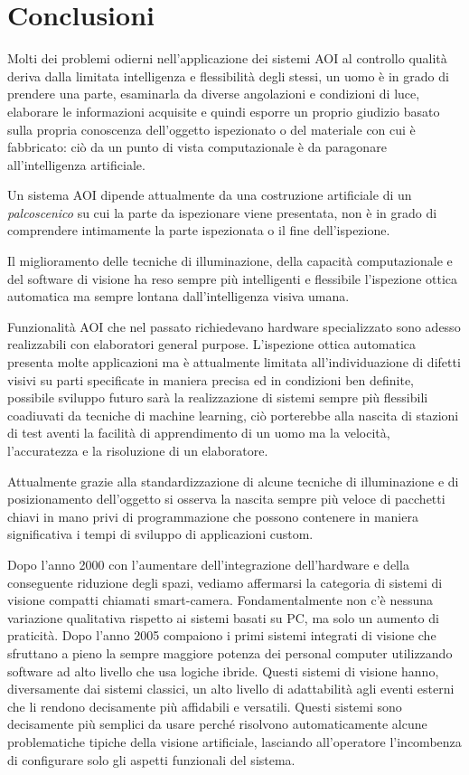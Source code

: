 \chapter{Conclusioni} 

Molti dei problemi odierni nell'applicazione dei sistemi
AOI al controllo qualità deriva dalla limitata intelligenza e flessibilità
degli stessi, un uomo è in grado di prendere una parte, esaminarla da diverse
angolazioni e condizioni di luce, elaborare le informazioni acquisite e quindi
esporre un proprio giudizio basato sulla propria conoscenza dell'oggetto
ispezionato o del materiale con cui è fabbricato: ciò da un punto di vista
computazionale è da paragonare all'intelligenza artificiale.

Un sistema AOI dipende attualmente da una costruzione artificiale di un \emph{palcoscenico} su
cui la parte da ispezionare viene presentata, non è in grado di comprendere
intimamente la parte ispezionata o il fine dell'ispezione.

Il miglioramento delle tecniche di
illuminazione, della capacità computazionale e del software di visione ha reso
sempre più intelligenti e flessibile l'ispezione ottica automatica ma sempre
lontana dall'intelligenza visiva umana.

Funzionalità AOI che nel passato
richiedevano hardware specializzato sono adesso realizzabili con elaboratori
general purpose. L'ispezione ottica automatica presenta molte applicazioni ma
è attualmente limitata all'individuazione di difetti visivi su parti
specificate in maniera precisa ed in condizioni ben definite, possibile
sviluppo futuro sarà la realizzazione di sistemi sempre più flessibili
coadiuvati da tecniche di machine learning, ciò porterebbe alla nascita di
stazioni di test aventi la facilità di apprendimento di un uomo ma la
velocità, l'accuratezza e la risoluzione di un elaboratore.

Attualmente grazie alla standardizzazione di alcune tecniche di illuminazione
e di posizionamento dell'oggetto si osserva la nascita sempre più veloce di
pacchetti chiavi in mano privi di programmazione che possono contenere in
maniera significativa i tempi di sviluppo di applicazioni custom.

Dopo l'anno 2000 con l'aumentare dell'integrazione dell'hardware e della
conseguente riduzione degli spazi, vediamo affermarsi la categoria di sistemi
di visione compatti chiamati smart-camera. Fondamentalmente non c'è nessuna
variazione qualitativa rispetto ai sistemi basati su PC, ma solo un aumento di
praticità. Dopo l'anno 2005 compaiono i primi sistemi integrati di visione che
sfruttano a pieno la sempre maggiore potenza dei personal computer utilizzando
software ad alto livello che usa logiche ibride. Questi sistemi di visione
hanno, diversamente dai sistemi classici, un alto livello di adattabilità agli
eventi esterni che li rendono decisamente più affidabili e versatili. Questi
sistemi sono decisamente più semplici da usare perché risolvono
automaticamente alcune problematiche tipiche della visione artificiale,
lasciando all'operatore l'incombenza di configurare solo gli aspetti
funzionali del sistema.

